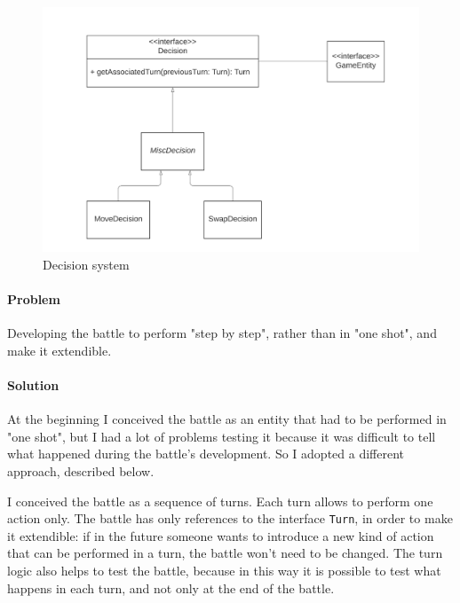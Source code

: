 \documentclass[12pt, a4paper]{report}
\begin{document}
        \begin{figure}[H]
            \centering{}
            \caption{Decision system}
            \includegraphics[width=\textwidth]{decisions}
        \end{figure}

            \paragraph{Problem} 

            Developing the battle to perform "step by step", rather than in "one shot", and make it extendible.

            \paragraph{Solution}

            At the beginning I conceived the battle as an entity that had to be performed in "one shot", but I had a lot of problems 
            testing it because it was difficult to tell what happened during the battle's development. So I adopted a different
            approach, described below.

            I conceived the battle as a sequence of turns. Each turn allows to perform one action only. The battle has only
            references to the interface \verb|Turn|, in order to make it extendible: if in the future someone wants to introduce
            a new kind of action that can be performed in a turn, the battle won't need to be changed.
            The turn logic also helps to test the battle, because in this way it is possible to test what happens in each turn,
            and not only at the end of the battle.
\end{document}

